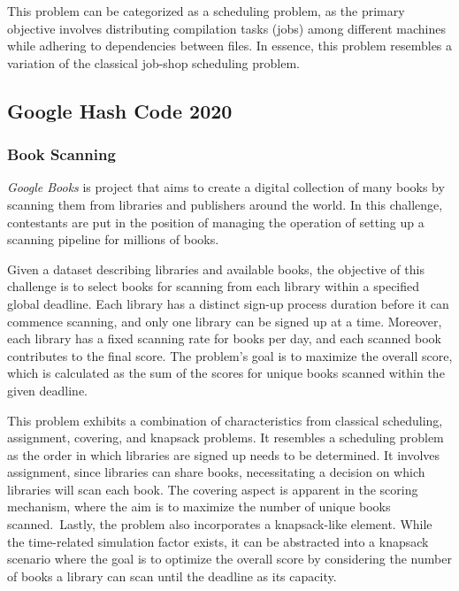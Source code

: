 This problem can be categorized as a scheduling problem, as the primary
objective involves distributing compilation tasks (jobs) among different
machines while adhering to dependencies between files. In essence, this problem
resembles a variation of the classical job-shop scheduling problem.

\subsection{Google Hash Code 2020}
\label{subsec:hashcode-2020}

\subsubsection*{Book Scanning}
\label{subsubsec:hashcode-2020-qualification}

\textit{Google Books} is project that aims to create a digital collection of many books
by scanning them from libraries and publishers around the world. In this
challenge, contestants are put in the position of managing the operation of
setting up a scanning pipeline for millions of books.

Given a dataset describing libraries and available books, the objective of this
challenge is to select books for scanning from each library within a specified
global deadline. Each library has a distinct sign-up process duration before it can
commence scanning, and only one library can be signed up at a time. Moreover,
each library has a fixed scanning rate for books per day, and each scanned book
contributes to the final score. The problem's goal is to maximize the overall
score, which is calculated as the sum of the scores for unique books scanned
within the given deadline.

This problem exhibits a combination of characteristics from classical
scheduling, assignment, covering, and knapsack problems. It resembles a
scheduling problem as the order in which libraries are signed up needs to be
determined. It involves assignment, since libraries can share books,
necessitating a decision on which libraries will scan each book. The covering
aspect is apparent in the scoring mechanism, where the aim is to maximize the
number of unique books scanned.~Lastly, the problem also incorporates a
knapsack-like element. While the time-related simulation factor exists, it can
be abstracted into a knapsack scenario where the goal is to optimize the overall
score by considering the number of books a library can scan until the deadline
as its capacity.


